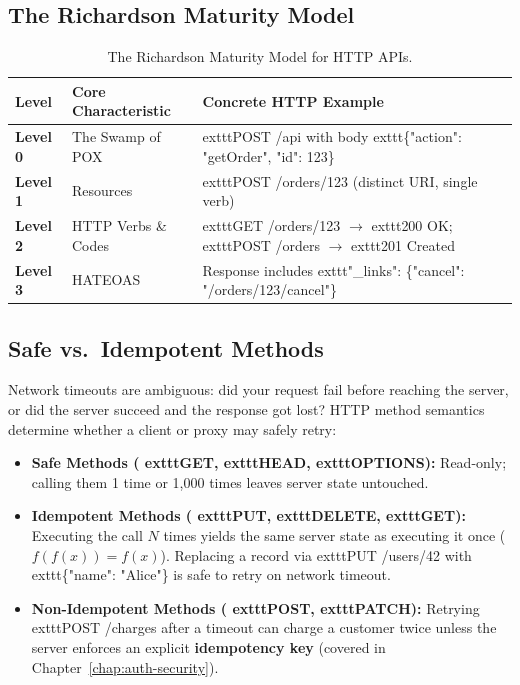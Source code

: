 \subsection{The Richardson Maturity Model}

\begin{table}[htbp]
\centering
\small\sffamily
\begin{tabular}{@{}lll@{}}
\toprule
\textbf{Level} & \textbf{Core Characteristic} & \textbf{Concrete HTTP Example} \\ \midrule
\textbf{Level 0} & The Swamp of POX & 	exttt{POST /api} with body 	exttt{\{"action": "getOrder", "id": 123\}} \\
\textbf{Level 1} & Resources & 	exttt{POST /orders/123} (distinct URI, single verb) \\
\textbf{Level 2} & HTTP Verbs \& Codes & 	exttt{GET /orders/123} $\rightarrow$ 	exttt{200 OK}; 	exttt{POST /orders} $\rightarrow$ 	exttt{201 Created} \\
\textbf{Level 3} & HATEOAS & Response includes 	exttt{"\_links": \{"cancel": "/orders/123/cancel"\}} \\ \bottomrule
\end{tabular}
\caption{The Richardson Maturity Model for HTTP APIs.}
\label{tab:v1-ch01-richardson}
\end{table}

\subsection{Safe vs.\ Idempotent Methods}

Network timeouts are ambiguous: did your request fail before reaching the server, or did the server succeed and the response got lost? HTTP method semantics determine whether a client or proxy may safely retry:
\begin{itemize}[leftmargin=15pt]
  \item \textbf{Safe Methods (	exttt{GET}, 	exttt{HEAD}, 	exttt{OPTIONS}):} Read-only; calling them 1 time or 1,000 times leaves server state untouched.
  \item \textbf{Idempotent Methods (	exttt{PUT}, 	exttt{DELETE}, 	exttt{GET}):} Executing the call $N$ times yields the same server state as executing it once ($f(f(x)) = f(x)$). Replacing a record via 	exttt{PUT /users/42} with 	exttt{\{"name": "Alice"\}} is safe to retry on network timeout.
  \item \textbf{Non-Idempotent Methods (	exttt{POST}, 	exttt{PATCH}):} Retrying 	exttt{POST /charges} after a timeout can charge a customer twice unless the server enforces an explicit \textbf{idempotency key} (covered in Chapter~\ref{chap:auth-security}).
\end{itemize}

